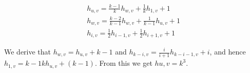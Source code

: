 \documentclass[12pt, a4paper]{article}
\begin{document}
\begin{align*}
  h_{u,v} = \frac{k - 1}{k}h_{w,v} + \frac{1}{k}h_{1,v} + 1\\
  h_{w,v} = \frac{k - 2}{k - 1}h_{w,v} + \frac{1}{k - 1}h_{u,v} + 1\\
  h_{i,v} = \frac{1}{2}h_{i-1 ,v} + \frac{1}{2}h_{i+1,v} + 1
\end{align*}

We derive that $h_{w,v} = h_{u,v} + k - 1$ and $h_{k-i,v} =
\frac{i}{i+1}h_{k-i-1,v} + i$, and hence $h_{1,v} = k - 1kh_{u,v} + (k - 1)$. From this we get $h{u,v} = k^3$.
\end{document}

